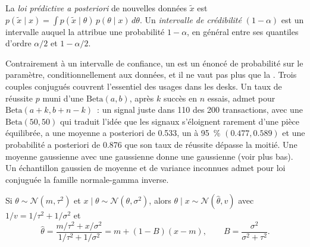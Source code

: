 \begin{definition}\label{def:qm:bayesian-methods:predictive}
La \emph{loi prédictive a posteriori} de nouvelles données $\tilde x$ est $p(\tilde x \mid x) = \int
p(\tilde x \mid \theta)\,p(\theta \mid x)\,d\theta$. Un \emph{intervalle de crédibilité} $(1 - \alpha)$ est un intervalle
auquel la  attribue une probabilité $1 - \alpha$, en général entre ses quantiles d'ordre $\alpha/2$ et $1 - \alpha/2$.
\end{definition}

Contrairement à un intervalle de confiance, un  est un énoncé de probabilité sur le paramètre, conditionnellement aux données, et il ne vaut pas plus que
la . Trois couples conjugués couvrent l'essentiel des usages dans les desks. Un taux de réussite $p$ muni d'une  $\mathrm{Beta}(a, b)$, après $k$ succès en $n$ essais,
admet pour  $\mathrm{Beta}(a + k, b + n - k)$~: un signal juste dans 110 des 200 transactions, avec une  $\mathrm{Beta}(50, 50)$ qui traduit
l'idée que les signaux s'éloignent rarement d'une pièce équilibrée, a une moyenne a posteriori de 0.533, un  à 95~\% $(0.477, 0.589)$ et une probabilité a posteriori de
0.876 que son taux de réussite dépasse la moitié. Une moyenne gaussienne avec une  gaussienne donne une  gaussienne (voir plus bas). Un échantillon gaussien
de moyenne et de variance inconnues admet pour loi conjuguée la famille normale-gamma inverse.

\begin{proposition}\label{prop:qm:bayesian-methods:normal}
Si $\theta \sim \mathcal N(m, \tau^2)$ et $x \mid \theta \sim \mathcal N(\theta, \sigma^2)$, alors $\theta \mid x \sim \mathcal N(\hat\theta,
v)$ avec $1/v = 1/\tau^2 + 1/\sigma^2$ et
\[
\hat\theta = \frac{m/\tau^2 + x/\sigma^2}{1/\tau^2 + 1/\sigma^2} = m + (1 - B)(x - m), \qquad B = \frac{\sigma^2}{\sigma^2 + \tau^2}.
\]
\end{proposition}

